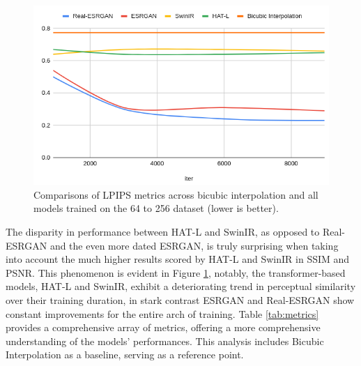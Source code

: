 \begin{figure}[H]
  \centering
  \includegraphics[scale=0.4]{figures/LPIPS_2.png}
  \caption{Comparisons of LPIPS metrics across bicubic interpolation and all models trained on the 64 to 256 dataset (lower is better).}
  \label{img:lpips}
\end{figure}


The disparity in performance between HAT-L and SwinIR, as opposed to Real-ESRGAN and the even more dated ESRGAN, is truly surprising when taking into account the much higher results scored by HAT-L and SwinIR in SSIM and PSNR. This phenomenon is evident in Figure \ref{img:lpips}, notably, the transformer-based models, HAT-L and SwinIR, exhibit a deteriorating trend in perceptual similarity over their training duration, in stark contrast ESRGAN and Real-ESRGAN show constant improvements for the entire arch of training. Table \ref{tab:metrics} provides a comprehensive array of metrics, offering a more comprehensive understanding of the models' performances. This analysis includes Bicubic Interpolation as a baseline, serving as a reference point.


